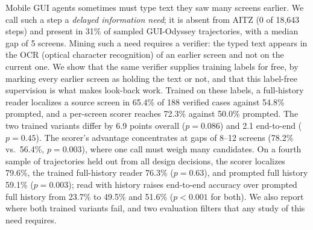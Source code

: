 Mobile GUI agents sometimes must type text they saw many screens earlier. We call such a step a \emph{delayed information need}; it is absent from AITZ (0 of 18,643 steps) and present in 31\% of sampled GUI-Odyssey trajectories, with a median gap of 5 screens. Mining such a need requires a verifier: the typed text appears in the OCR (optical character recognition) of an earlier screen and not on the current one. We show that the same verifier supplies training labels for free, by marking every earlier screen as holding the text or not, and that this label-free supervision is what makes look-back work. Trained on these labels, a full-history reader localizes a source screen in 65.4\% of 188 verified cases against 54.8\% prompted, and a per-screen scorer reaches 72.3\% against 50.0\% prompted. The two trained variants differ by 6.9 points overall ($p=0.086$) and 2.1 end-to-end ($p=0.45$). The scorer's advantage concentrates at gaps of 8--12 screens (78.2\% vs.\ 56.4\%, $p=0.003$), where one call must weigh many candidates. On a fourth sample of trajectories held out from all design decisions, the scorer localizes 79.6\%, the trained full-history reader 76.3\% ($p=0.63$), and prompted full history 59.1\% ($p=0.003$); read with history raises end-to-end accuracy over prompted full history from 23.7\% to 49.5\% and 51.6\% ($p<0.001$ for both). We also report where both trained variants fail, and two evaluation filters that any study of this need requires.
